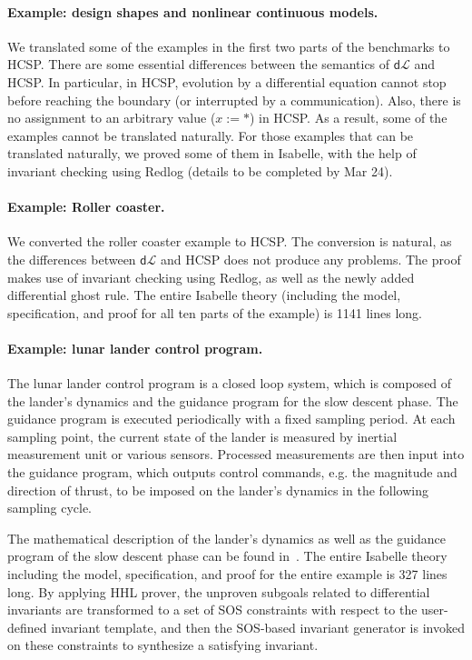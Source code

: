 \documentclass[runningheads,a4paper]{llncs}
\newcommand{\dL}{\mathsf{d}\mathcal{L}}
\begin{document}
 






 
 
 

\paragraph{Example: design shapes and nonlinear continuous models.}

We translated some of the examples in the first two parts of the
benchmarks to HCSP. There are some essential differences between the
semantics of $\dL$ and HCSP. In particular, in HCSP, evolution by a
differential equation cannot stop before reaching the boundary (or
interrupted by a communication). Also, there is no assignment to an
arbitrary value ($x := *$) in HCSP. As a result, some of the examples
cannot be translated naturally. For those examples that can be
translated naturally, we proved some of them in Isabelle, with the
help of invariant checking using Redlog (details to be completed by
Mar 24).

\paragraph{Example: Roller coaster.}

We converted the roller coaster example \cite{coasterx} to HCSP. The
conversion is natural, as the differences between $\dL$ and HCSP does
not produce any problems. The proof makes use of invariant checking
using Redlog, as well as the newly added differential ghost rule. The
entire Isabelle theory (including the model, specification, and proof
for all ten parts of the example) is 1141 lines long.

\paragraph{Example: lunar lander control program.}

The lunar lander control program is a closed loop system, which is
composed of the lander's dynamics and the guidance program for the
slow descent phase. The guidance program is executed periodically with
a fixed sampling period. At each sampling point, the current state of
the lander is measured by inertial measurement unit or various
sensors. Processed measurements are then input into the guidance
program, which outputs control commands, e.g. the magnitude and
direction of thrust, to be imposed on the lander's dynamics in the
following sampling cycle.

The mathematical description of the lander's dynamics as well as the
guidance program of the slow descent phase can be found
in~\cite{ZYZG14,ZhanWZ16}. The entire Isabelle theory including the
model, specification, and proof for the entire example is 327 lines
long. By applying HHL prover, the unproven subgoals related to
differential invariants are transformed to a set of SOS constraints
with respect to the user-defined invariant template, and then the
SOS-based invariant generator is invoked on these constraints to
synthesize a satisfying invariant.




\end{document}
